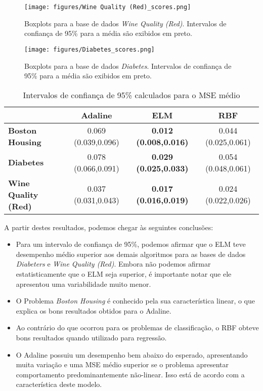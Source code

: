 \documentclass[conference]{IEEEtran}
\begin{document}
	\begin{figure}[thpbh]
		\centering
		\texttt{[image: figures/Wine Quality (Red)\_scores.png]}
		\caption{Boxplots para a base de dados \textit{Wine Quality (Red)}. Intervalos de confiança de 95\% para a média são exibidos em preto.}
		\label{fig:box-Wine}
	\end{figure}
	
	\begin{figure}[thpbh]
		\centering
		\texttt{[image: figures/Diabetes\_scores.png]}
		\caption{Boxplots para a base de dados \textit{Diabetes}. Intervalos de confiança de 95\% para a média são exibidos em preto.}
		\label{fig:box-Diabetes}
	\end{figure}

	
	\begin{table*}[thpbh]
		\caption{Intervalos de confiança de 95\% calculados para o MSE médio}
		\label{tab:regression}
		\centering
			\begin{tabular}{l|c|c|c|}
				\cline{2-4}
				& \textbf{Adaline} & \textbf{ELM}              & \textbf{RBF}     \\ \hline
				\multicolumn{1}{|l|}{\textbf{Boston Housing}} & 0.069 (0.039,0.096) & \textbf{0.012 (0.008,0.016)} & 0.044 (0.025,0.061) \\ \hline
				\multicolumn{1}{|l|}{\textbf{Diabetes}}       & 0.078 (0.066,0.091) & \textbf{0.029 (0.025,0.033)} & 0.054 (0.048,0.061) \\ \hline
				\multicolumn{1}{|l|}{\textbf{Wine Quality (Red)}}     & 0.037 (0.031,0.043) & \textbf{0.017 (0.016,0.019)} & 0.024 (0.022,0.026) \\ \hline
			\end{tabular}
	\end{table*}

	A partir destes resultados, podemos chegar às seguintes conclusões:
	\begin{itemize}
		\item Para um intervalo de confiança de 95\%, podemos afirmar que o ELM teve desempenho médio superior aos demais algoritmos para as bases de dados \textit{Diabeters} e \textit{Wine Quality (Red)}. Embora não podemos afirmar estatisticamente que o ELM seja superior, é importante notar que ele apresentou uma variabilidade muito menor.
		\item O Problema \textit{Boston Housing} é conhecido pela sua característica linear, o que explica os bons resultados obtidos para o Adaline.
		\item Ao contrário do que ocorrou para os problemas de classificação, o RBF obteve bons resultados quando utilizado para regressão.
		\item O Adaline possuiu um desempenho bem abaixo do esperado, apresentando muita variação e uma MSE médio superior se o problema apresentar comportamento predominantemente não-linear. Isso está de acordo com a característica deste modelo.
	\end{itemize}
	
\end{document}
